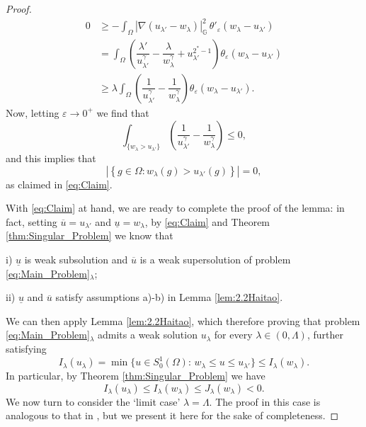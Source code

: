 \documentclass[11pt]{amsart}
\numberwithin{equation}{section} %
\theoremstyle{definition}
\begin{document}
\begin{proof}
	\begin{equation}\label{eq:Subtraction}
		\begin{aligned}
			0 &\geq  - \int_{\Omega}|\nabla(u_{\lambda'}-w_{\lambda})|_{\mathbb{G}}^2 \, \theta'_{\varepsilon}(w_{\lambda}-u_{\lambda'})\\
			&= \int_{\Omega}\left( \dfrac{\lambda'}{u_{\lambda'}^{\gamma}} - \dfrac{\lambda}{w_{\lambda}^{\gamma}} + u_{\lambda'}^{2^{*}-1}\right) \theta_{\varepsilon}(w_{\lambda}-u_{\lambda'})\\
			&\geq \lambda \int_{\Omega}\left( \dfrac{1}{u_{\lambda'}^{\gamma}}- \dfrac{1}{w_{\lambda}^{\gamma}}\right)\theta_{\varepsilon}(w_{\lambda}-u_{\lambda'}).
		\end{aligned}
	\end{equation}
	Now, letting $\varepsilon \to 0^+$ we find that
	$$\int_{\{w_{\lambda}> u_{\lambda'}\}}\left( \dfrac{1}{u_{\lambda'}^{\gamma}}- \dfrac{1}{w_{\lambda}^{\gamma}}\right)\leq 0,$$
	\noindent and this implies that
	$$\left|\left\{ g \in \Omega: w_{\lambda}(g) > u_{\lambda'}(g)\right\}\right| = 0,$$
	\noindent as claimed in \eqref{eq:Claim}. \vspace*{0.1cm}
	
	With \eqref{eq:Claim} at hand, we are ready to complete the proof
	of the lemma: in fact, setting  $\overline{u}= u_{\lambda'}$ and $\underline{u} = w_{\lambda}$, 
	by \eqref{eq:Claim} and Theorem \ref{thm:Singular_Problem} we know that
	\vspace*{0.1cm}
	
	i)\,\,$\underline{u}$ is weak subsolution and $\overline{u}$ is a weak supersolution
	of problem \eqref{eq:Main_Problem}$_\lambda$;
	\vspace*{0.05cm}
	
	ii)\,\,$\underline{u}$ and $\overline{u}$ satisfy assumptions a)-b) in Lemma \ref{lem:2.2Haitao}.
	\vspace*{0.1cm}
	
	\noindent We can then apply Lemma \ref{lem:2.2Haitao}, which therefore proving that problem \eqref{eq:Main_Problem}$_{\lambda}$ admits a weak solution $u_{\lambda}$ for every $\lambda \in (0,\Lambda)$,
	further satisfying
	$$I_{\lambda}(u_\lambda) = \min\{u\in S_0^1(\Omega):\,w_{\lambda}\leq u\leq u_{\lambda'}\}
\leq I_{\lambda}(w_{\lambda}).$$
In particular,
by Theorem \ref{thm:Singular_Problem} we have
\begin{equation} \label{eq:Ilambdaulambdaneg}
 I_{\lambda}(u_{\lambda}) \leq I_{\lambda}(w_{\lambda}) \leq J_{\lambda}(w_{\lambda}) <0.
 \end{equation}
	We now turn to consider the `limit case' $\lambda = \Lambda$. The proof
	in this case is analogous to that in
	\cite[Lemma 2.3]{Haitao}, but we present it here for the sake of completeness.
	

\end{proof}
\end{document}

